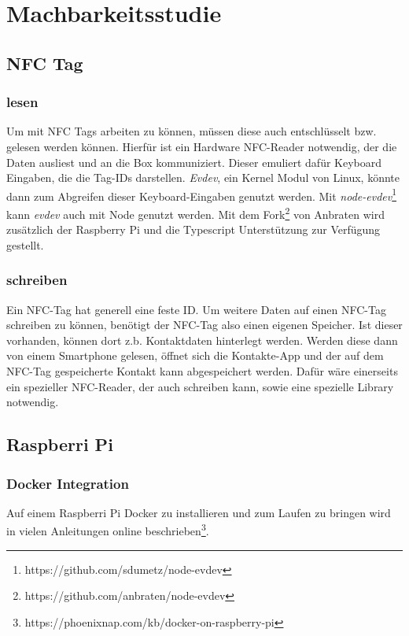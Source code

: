 \documentclass[10pt, a4paper]{article}
\begin{document}
\section{Machbarkeitsstudie}

\subsection{NFC Tag}
\subsubsection{lesen}
Um mit NFC Tags arbeiten zu können, müssen diese auch entschlüsselt bzw. gelesen werden können.
Hierfür ist ein Hardware NFC-Reader notwendig, der die Daten ausliest und an die Box kommuniziert.
Dieser emuliert dafür Keyboard Eingaben, die die Tag-IDs darstellen.
\textit{Evdev}, ein Kernel Modul von Linux, könnte dann zum Abgreifen dieser Keyboard-Eingaben genutzt werden. Mit \textit{node-evdev}\footnote{https://github.com/sdumetz/node-evdev} kann \textit{evdev} auch mit Node genutzt werden. Mit dem Fork\footnote{https://github.com/anbraten/node-evdev} von Anbraten wird zusätzlich der Raspberry Pi und die Typescript Unterstützung zur Verfügung gestellt.

\subsubsection{schreiben}
Ein NFC-Tag hat generell eine feste ID.
Um weitere Daten auf einen NFC-Tag schreiben zu können, benötigt der NFC-Tag also einen eigenen Speicher.
Ist dieser vorhanden, können dort z.b. Kontaktdaten hinterlegt werden. Werden diese dann von einem Smartphone gelesen, öffnet sich die Kontakte-App und der auf dem NFC-Tag gespeicherte Kontakt kann abgespeichert werden.
Dafür wäre einerseits ein spezieller NFC-Reader, der auch schreiben kann, sowie eine spezielle Library notwendig.

\subsection{Raspberri Pi}
\subsubsection{Docker Integration}
Auf einem Raspberri Pi Docker zu installieren und zum Laufen zu bringen wird in vielen Anleitungen online beschrieben\footnote{https://phoenixnap.com/kb/docker-on-raspberry-pi}.
\end{document}
